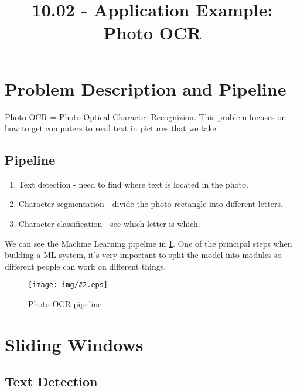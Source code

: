 \documentclass[10pt]{extarticle}
\newcommand{\stdfig}[3]{
    \begin{figure}
    \centering
    \texttt{[image: img/\#2.eps]}
    \caption{#3}
    \label{fig:#2}
    \end{figure}
}
\begin{document}
 



\title{10.02 - Application Example: Photo OCR}

    
    \date{}
    

    

    \maketitle

\newpage





\section{Problem Description and
Pipeline}\label{problem-description-and-pipeline}

Photo OCR = Photo Optical Character Recognizion. This problem focuses on
how to get computers to read text in pictures that we take.

\subsection{Pipeline}\label{pipeline}

\begin{enumerate}
\def\labelenumi{\arabic{enumi}.}
\itemsep1pt\parskip0pt
\item
  Text detection - need to find where text is located in the photo.
\item
  Character segmentation - divide the photo rectangle into different
  letters.
\item
  Character classification - see which letter is which.
\end{enumerate}

We can see the Machine Learning pipeline in
\cref{fig:photo_ocr_pipeline}. One of the principal steps when building
a ML system, it's very important to split the model into modules so
different people can work on different things.

\stdfig{12cm}{photo_ocr_pipeline}{Photo OCR pipeline}

\section{Sliding Windows}\label{sliding-windows}

\subsection{Text Detection}\label{text-detection}
\end{document}
